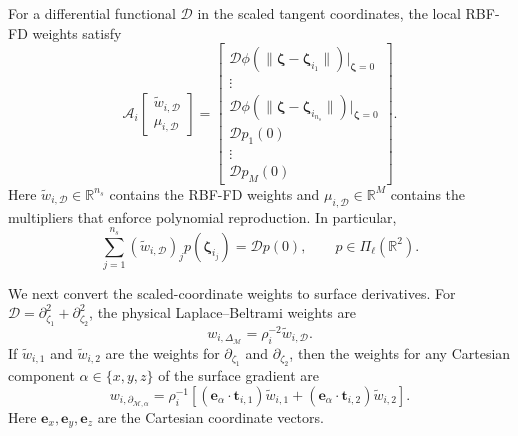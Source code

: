 \documentclass[a4paper,fleqn]{cas-sc}
\begin{document}
For a differential functional $\mathcal D$ in the scaled tangent coordinates,
the local RBF-FD weights satisfy
\begin{equation}
  \mathcal A_i
  \begin{bmatrix}
    \widetilde w_{i,\mathcal D}\\
    \mu_{i,\mathcal D}
  \end{bmatrix}
  =
  \begin{bmatrix}
    \mathcal D\phi(\|\bm\zeta-\bm\zeta_{i_1}\|)|_{\bm\zeta=0}\\
    \vdots\\
    \mathcal D\phi(\|\bm\zeta-\bm\zeta_{i_{n_s}}\|)|_{\bm\zeta=0}\\
    \mathcal D p_1(0)\\
    \vdots\\
    \mathcal D p_M(0)
  \end{bmatrix}.
  \label{eq:tp-local-weights}
\end{equation}
Here $\widetilde w_{i,\mathcal D}\in\mathbb R^{n_s}$ contains the RBF-FD
weights and $\mu_{i,\mathcal D}\in\mathbb R^M$ contains the multipliers that
enforce polynomial reproduction.  In particular,
\begin{equation}
  \sum_{j=1}^{n_s}
  (\widetilde w_{i,\mathcal D})_j p(\bm\zeta_{i_j})
  =
  \mathcal Dp(0),
  \qquad p\in\Pi_\ell(\mathbb R^2).
  \label{eq:tp-polynomial-reproduction}
\end{equation}

We next convert the scaled-coordinate weights to surface derivatives.  For
$\mathcal D=\partial_{\zeta_1}^2+\partial_{\zeta_2}^2$, the physical
Laplace--Beltrami weights are
\begin{equation}
  w_{i,\Delta_{\mathcal M}}
  =
  \rho_i^{-2}\widetilde w_{i,\mathcal D}.
  \label{eq:tp-laplacian-row}
\end{equation}
If $\widetilde w_{i,1}$ and $\widetilde w_{i,2}$ are the weights for
$\partial_{\zeta_1}$ and $\partial_{\zeta_2}$, then the weights for any Cartesian component $\alpha\in\{x,y,z\}$ of the surface gradient are
\begin{equation}
  w_{i,\partial_{\mathcal M,\alpha}}
  =
  \rho_i^{-1}
  \left[
    (\bm e_\alpha\cdot\bm t_{i,1})\widetilde w_{i,1}
    +(\bm e_\alpha\cdot\bm t_{i,2})\widetilde w_{i,2}
  \right].
  \label{eq:tp-gradient-row}
\end{equation}
Here $\bm e_x,\bm e_y,\bm e_z$ are the Cartesian coordinate vectors.
\end{document}
